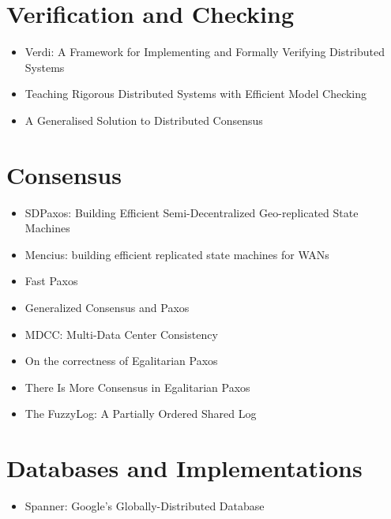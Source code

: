 \documentclass{article}
\begin{document}
\section{Verification and Checking}

\begin{itemize}
	\item{Verdi: A Framework for Implementing and Formally Verifying Distributed Systems \cite{Verdi}}
	\item{Teaching Rigorous Distributed Systems with Efficient Model Checking \cite{MichaelWAET2019}}
	\item{A Generalised Solution to Distributed Consensus \cite{HowardGeneralized}}
\end{itemize}

\section{Consensus}

\begin{itemize}
	\item{SDPaxos: Building Efficient Semi-Decentralized Geo-replicated State Machines \cite{zhao2018sdpaxos}}
	\item{Mencius: building efficient replicated state machines for WANs \cite{Mencius}}
	\item{Fast Paxos \cite{lamport2006fast}}
	\item{Generalized Consensus and Paxos \cite{lamport2005generalized}}
	\item{MDCC: Multi-Data Center Consistency \cite{MDCC}}
	\item{On the correctness of Egalitarian Paxos \cite{SutraEPaxos}}
	\item{There Is More Consensus in Egalitarian Paxos \cite{EPaxos}}
	\item{The FuzzyLog: A Partially Ordered Shared Log \cite{FuzzyLog}}
\end{itemize}

\section{Databases and Implementations}

\begin{itemize}
	\item{Spanner: Google's Globally-Distributed Database \cite{Spanner}}
\end{itemize}



\end{document}
